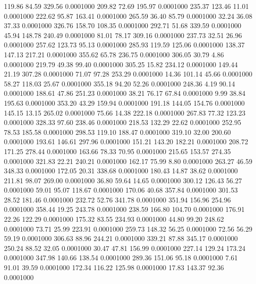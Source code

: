  119.86   84.59  329.56   0.0001000
 209.82   72.69  195.97   0.0001000
 235.37  123.46   11.01   0.0001000
 222.62   95.87  163.41   0.0001000
 265.59   36.40   85.79   0.0001000
  32.24   36.08   37.33   0.0001000
 326.76  158.70  108.35   0.0001000
 292.71   51.68  339.59   0.0001000
  45.94  148.78  240.49   0.0001000
  81.01   78.17  309.16   0.0001000
 237.73   32.51   26.96   0.0001000
 257.62  123.73   95.13   0.0001000
 285.93  119.59  125.06   0.0001000
 138.37  147.13  217.21   0.0001000
 355.62   65.78  236.75   0.0001000
 306.05   30.79    4.86   0.0001000
 219.79   49.38   99.40   0.0001000
 305.25   15.82  234.12   0.0001000
 149.44   21.19  307.28   0.0001000
  71.07   97.28  253.29   0.0001000
  14.36  101.14   45.66   0.0001000
  58.27  118.03   25.67   0.0001000
 355.18   94.20   52.26   0.0001000
 248.36    4.19   90.14   0.0001000
 188.61   47.86  251.23   0.0001000
  38.21   76.17   67.84   0.0001000
   9.99   38.84  195.63   0.0001000
 353.20   43.29  159.94   0.0001000
 191.18  144.05  154.76   0.0001000
 145.15   13.15  265.02   0.0001000
  75.66   14.38  222.18   0.0001000
 267.83   77.32  123.23   0.0001000
 328.33   97.60  238.46   0.0001000
 218.53  132.29   22.62   0.0001000
 252.95   78.53  185.58   0.0001000
 298.53  119.10  188.47   0.0001000
 319.10   32.00  200.60   0.0001000
 193.61  146.61  297.96   0.0001000
 151.21  143.20  182.21   0.0001000
 208.72  171.25  278.44   0.0001000
 163.66   78.33   70.95   0.0001000
 215.65  153.57  274.35   0.0001000
 321.83   22.21  240.21   0.0001000
 162.17   75.99    8.80   0.0001000
 263.27   46.59  348.33   0.0001000
 172.05   20.31  338.68   0.0001000
 180.43   14.87   38.62   0.0001000
 211.81   98.07  269.00   0.0001000
  36.80   59.64   14.65   0.0001000
 300.12  126.43   56.27   0.0001000
  59.01   95.07  118.67   0.0001000
 170.06   40.68  357.84   0.0001000
 301.53   28.52  181.46   0.0001000
 232.72   52.76  341.78   0.0001000
 351.94  156.96  254.96   0.0001000
 358.44   19.25  243.78   0.0001000
 238.59  166.80  104.70   0.0001000
 176.91   22.26  122.29   0.0001000
 175.32   83.55  234.93   0.0001000
  44.80   99.20  248.62   0.0001000
  73.71   25.99  223.91   0.0001000
 259.73  148.32   56.25   0.0001000
  72.56   56.29   59.19   0.0001000
 306.63   88.96  244.21   0.0001000
 339.21   87.88  345.17   0.0001000
 250.24   88.52   32.05   0.0001000
  30.47   47.81  156.99   0.0001000
 227.14  129.24  173.24   0.0001000
 347.98  140.66  138.54   0.0001000
 289.36  151.06   95.18   0.0001000
   7.61   91.01   39.59   0.0001000
 172.34  116.22  125.98   0.0001000
  17.83  143.37   92.36   0.0001000
